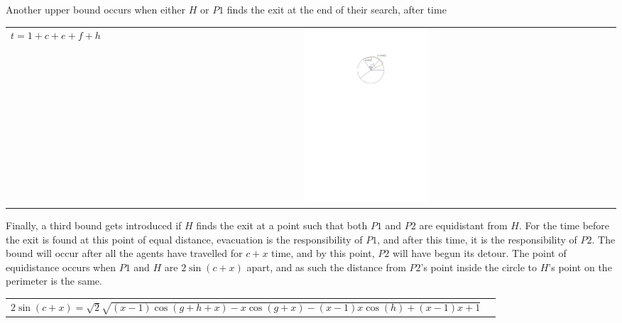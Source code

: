 \documentclass[11pt]{article}
\begin{document}
\begin{flushleft}
    Another upper bound occurs when either $H$ or $P1$ finds the exit at the end of
    their search, after time

    \begin{tabularx}{\textwidth}{lXc}
        \multirow{2}{*}{$t = 1+c+e+f+h$} & & \parbox[c]{0.25\textwidth}{\includegraphics[width=0.25\textwidth]{Q2S1_Eq/ub_2.pdf}} \\
    \end{tabularx}

    Finally, a third bound gets introduced if $H$ finds the exit at a point such that both
    $P1$ and $P2$ are equidistant from $H$. For the time before the exit is found at this point of equal
    distance, evacuation is the responsibility of $P1$, and after this time, it is the responsibility
    of $P2$. The bound will occur after all the agents have travelled for $c+x$ time, and by this point,
    $P2$ will have begun its detour. The point of equidistance occurs when $P1$ and $H$ are
    $2\sin(c+x)$ apart, and as such the distance from $P2$'s point inside the circle to $H$'s point on
    the perimeter is the same.

    \begin{tabularx}{\textwidth}{p{}l}
        \multirow{2}{*}{$2\sin(c+x) =
        \sqrt{2}\sqrt{(x-1)\cos(g+h+x) - x\cos(g+x) -
        (x-1)x\cos(h) + (x-1)x + 1}$} & \\
    \end{tabularx}

\end{flushleft}
\end{document}
